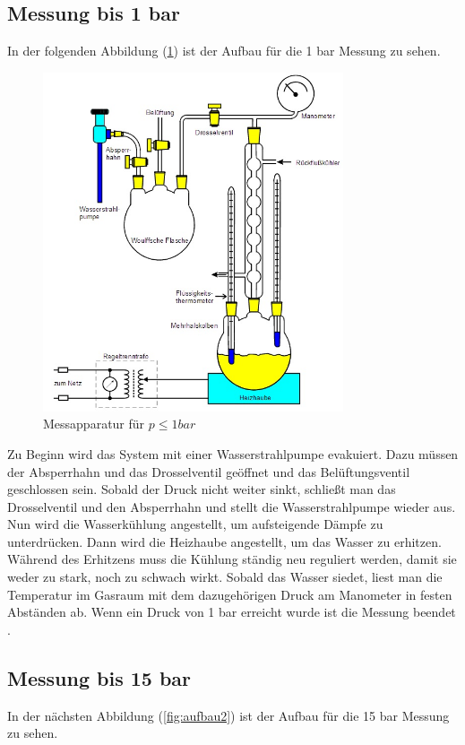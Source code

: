 \subsection{Messung bis 1 bar}
In der folgenden Abbildung (\ref{fig:aufbau1}) ist der Aufbau für die 1 bar Messung
zu sehen.

\begin{figure}
  \centering
  \includegraphics[height=10cm]{Aufbau1.jpg}
  \caption{Messapparatur für $p ≤ 1 bar$}
  \label{fig:aufbau1}
\end{figure}

Zu Beginn wird das System mit einer Wasserstrahlpumpe evakuiert. Dazu müssen der
Absperrhahn und das Drosselventil geöffnet und das Belüftungsventil geschlossen sein.
Sobald der Druck nicht weiter sinkt, schließt man das Drosselventil und den
Absperrhahn und stellt die Wasserstrahlpumpe wieder aus. Nun wird die Wasserkühlung
angestellt, um aufsteigende Dämpfe zu unterdrücken. Dann wird die Heizhaube angestellt,
um das Wasser zu erhitzen. Während des Erhitzens muss die Kühlung ständig neu
reguliert werden, damit sie weder zu stark, noch zu schwach wirkt.
Sobald das Wasser siedet, liest man die Temperatur im Gasraum
mit dem dazugehörigen Druck am Manometer in festen Abständen ab.
Wenn ein Druck von 1 bar erreicht wurde ist die Messung beendet \cite{TU}.

\subsection{Messung bis 15 bar}
In der nächsten Abbildung (\ref{fig:aufbau2}) ist der Aufbau für die 15 bar Messung
zu sehen.

